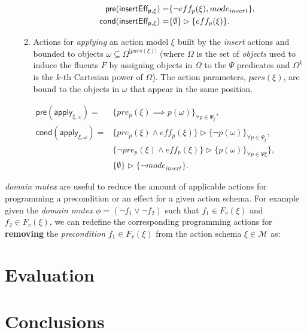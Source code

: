 \documentclass{article}
\newcommand{\pre}{\mathsf{pre}}     %
\newcommand{\cond}{\mathsf{cond}}   %
\begin{document}
\begin{itemize}
\begin{enumerate}
\begin{itemize}
\begin{small}
\begin{align*}
\hspace*{7pt}\pre(\mathsf{insertEff_{p,\xi}})=&\{\neg eff_{p}(\xi), mode_{insert}\},\\
\cond(\mathsf{insertEff_{p,\xi}})=&\{\emptyset\}\rhd\{eff_{p}(\xi)\}.
\end{align*}
\end{small}
\end{itemize}

\item Actions for {\em applying} an action model $\xi$ built by the {\em insert} actions and bounded to objects $\omega\subseteq\Omega^{|pars(\xi)|}$ (where $\Omega$ is the set of {\em objects} used to induce the fluents $F$ by assigning objects in $\Omega$ to the $\Psi$ predicates and $\Omega^k$ is the $k$-th Cartesian power of $\Omega$). The action parameters, $pars(\xi)$, are bound to the objects in $\omega$ that appear in the same position.
\end{enumerate}
\end{itemize}

\begin{small}
\begin{align*}
\pre(\mathsf{apply_{\xi,\omega}})=&\{pre_{p}(\xi)\implies p(\omega)\}_{\forall p\in\Psi_\xi},\\
\cond(\mathsf{apply_{\xi,\omega}})=&\{pre_{p}(\xi)\wedge eff_{p}(\xi)\}\rhd\{\neg p(\omega)\}_{\forall p\in\Psi_\xi},\\
&\{\neg pre_{p}(\xi)\wedge eff_{p}(\xi)\}\rhd\{p(\omega)\}_{\forall p\in\Psi\xi}\},\\
&\{\emptyset\}\rhd\{\neg mode_{insert}\}.
\end{align*}
\end{small}
















{\em domain mutex} are useful to reduce the amount of applicable actions for programming a precondition or an effect for a given action schema. For example given the {\em domain mutex} $\phi=(\neg f_1\vee \neg f_2)$ such that $f_1\in F_v(\xi)$ and $f_2\in F_v(\xi)$, we can redefine the corresponding programming actions for {\bf removing} the {\em precondition} $f_1\in F_v(\xi)$ from the action schema $\xi\in\mathcal{M}$ as:




\section{Evaluation}
\label{sec:evaluation}



\section{Conclusions}
\label{sec:conclusions}




\end{document}
